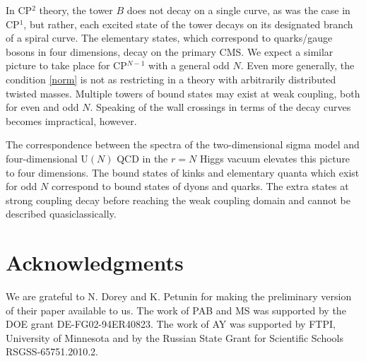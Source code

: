 \documentclass[epsfig,12pt]{article}
\begin{document}
	In CP$^2$ theory, the tower $ B $ does not decay on a single curve, as was the case in CP$^1$, but rather, 
	each excited state of the tower decays on its designated branch of a spiral curve. 
	The elementary states, which correspond to quarks/gauge bosons in four dimensions, decay on the primary CMS.
	We expect a similar picture to take place for CP$^{N-1}$ with a general odd $ N $.
	Even more generally, the condition \eqref{norm} is not as restricting in a theory with arbitrarily distributed 
	twisted masses.
	Multiple towers of bound states may exist at weak coupling, both for even and odd $ N $.
	Speaking of the wall crossings in terms of the decay curves becomes impractical, however.

	The correspondence between the spectra of the two-dimensional sigma model and four-dimensional U$(N)$ QCD
	in the $r=N$  Higgs vacuum elevates this picture to four dimensions.
	The bound states of kinks and elementary quanta which exist for odd $ N $ correspond to 
	bound states of dyons and quarks.
	The extra states at strong coupling decay before reaching the weak coupling domain and 
	cannot be described quasiclassically.

	

\section*{Acknowledgments}
We are grateful to N. Dorey and K. Petunin for making the preliminary version of their paper \cite{ndkp}
available to us.
The work of PAB and MS was supported by the DOE grant DE-FG02-94ER40823.
The work of AY was  supported
by  FTPI, University of Minnesota
and by the Russian State Grant for
Scientific Schools RSGSS-65751.2010.2.
	
	
\end{document}
